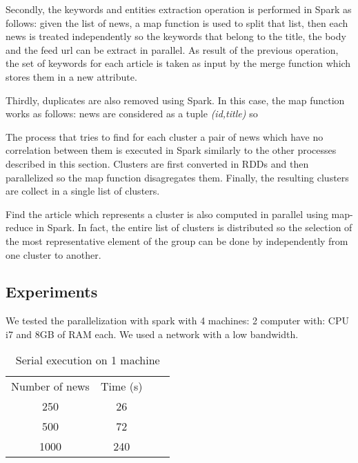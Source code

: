 \documentclass{acm_proc_article-sp}
\begin{document}

Secondly, the keywords and entities extraction operation is performed in Spark as follows: given the list of news, a map function is used to split that list, then each news is treated independently so the keywords that belong to the title, the body and the feed url can be extract in parallel. As result of the previous operation, the set of keywords for each article is taken as input by the merge function which stores them in a new attribute.

Thirdly, duplicates are also removed using Spark. In this case, the map function works as follows: news are considered as a tuple \textit{(id,title)} so

The process that tries to find for each cluster a pair of news which have no correlation between them is executed in Spark similarly to the other processes described in this section. Clusters are first converted in RDDs and then parallelized so the map function disagregates them. Finally, the resulting clusters are collect in a single list of clusters.

Find the article which represents a cluster is also computed in parallel using map-reduce in Spark. In fact, the entire list of clusters is distributed so the selection of the most representative element of the group can be done by independently from one cluster to another.

\subsection{Experiments}

We tested the parallelization with spark with 4 machines: 2 computer with: CPU i7 and 8GB of RAM each. We used a network with a low bandwidth.

\begin{table}[!ht]
\centering
\label{serial}
\begin{tabular}{cccc}
Number of news & Time (s) \\
250            & 26       \\
500            & 72       \\
1000           & 240      \\
\end{tabular}
\caption{Serial execution on 1 machine}
\end{table}
\end{document}
